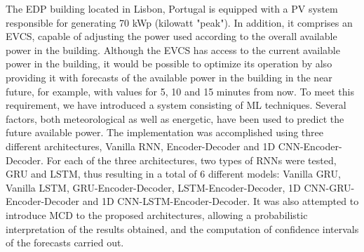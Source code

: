 \noindent The \ac{EDP} building located in Lisbon, Portugal is equipped with a \ac{PV} system responsible for generating 70 kWp (kilowatt "peak"). In addition, it comprises an \ac{EVCS}, capable of adjusting the power used according to the overall available power in the building. Although the \ac{EVCS} has access to the current available power in the building, it would be possible to optimize its operation by also providing it with forecasts of the available power in the building in the near future, for example, with values for 5, 10 and 15 minutes from now. To meet this requirement, we have introduced a system consisting of \ac{ML} techniques. Several factors, both meteorological as well as energetic, have been used to predict the future available power. The implementation was accomplished using three different architectures, Vanilla \ac{RNN}, Encoder-Decoder and \ac{1D CNN}-Encoder-Decoder. For each of the three architectures, two types of \ac{RNN}s were tested, \ac{GRU} and \ac{LSTM}, thus resulting in a total of 6 different models: Vanilla \ac{GRU}, Vanilla \ac{LSTM}, \ac{GRU}-Encoder-Decoder, \ac{LSTM}-Encoder-Decoder, \ac{1D CNN}-\ac{GRU}-Encoder-Decoder and \ac{1D CNN}-\ac{LSTM}-Encoder-Decoder. It was also attempted to introduce \ac{MCD} to the proposed architectures, allowing a probabilistic interpretation of the results obtained, and the computation of confidence intervals of the forecasts carried out. 
